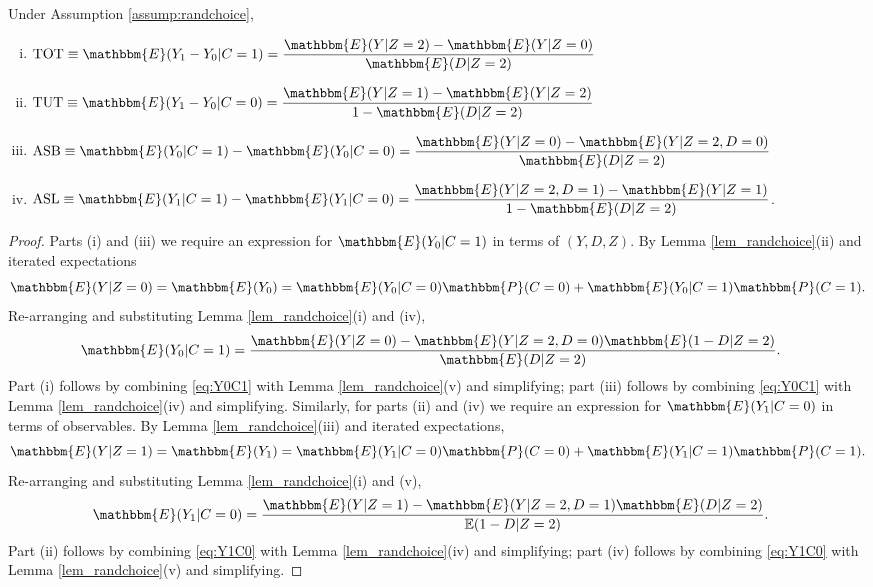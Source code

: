 \documentclass[12pt, a4paper]{article}
\begin{document}
\begin{prop} 
Under Assumption \ref{assump:randchoice},
    \begin{enumerate}[(i)]
        \item $\text{TOT} \equiv \mathbbm{E}(Y_1 - Y_0|C=1)  = \displaystyle \frac{\mathbbm{E}(Y|Z=2) - \mathbbm{E}(Y|Z=0)}{\mathbbm{E}(D|Z=2)}$
        \item $\text{TUT} \equiv \mathbbm{E}(Y_1 - Y_0|C=0) = \displaystyle \frac{\mathbbm{E}(Y|Z=1) - \mathbbm{E}(Y|Z=2)}{1 - \mathbbm{E}(D|Z=2)}$
        \item $\text{ASB} \equiv \mathbbm{E}(Y_0|C=1) - \mathbbm{E}(Y_0|C=0) = \displaystyle \frac{\mathbbm{E}(Y|Z=0) - \mathbbm{E}(Y|Z=2,D=0)}{\mathbbm{E}(D|Z=2)}$
        \item $\text{ASL} \equiv \mathbbm{E}(Y_1|C=1) - \mathbbm{E}(Y_1|C=0) = \displaystyle \frac{\mathbbm{E}(Y|Z=2,D=1) - \mathbbm{E}(Y|Z=1)}{1 - \mathbbm{E}(D|Z=2)}$.
    \end{enumerate}
\end{prop}

\begin{proof}
Parts (i) and (iii) we require an expression for $\mathbbm{E}(Y_0|C=1)$ in terms of $(Y, D, Z)$.
By Lemma \ref{lem_randchoice}(ii) and iterated expectations 
\[
\mathbbm{E}(Y|Z=0) = \mathbbm{E}(Y_0) = \mathbbm{E}(Y_0|C=0) \mathbbm{P}(C=0) + \mathbbm{E}(Y_0|C=1) \mathbbm{P}(C=1).
\]
Re-arranging and substituting Lemma \ref{lem_randchoice}(i) and (iv),
\begin{align}
\mathbbm{E}(Y_0|C=1)  
&=  \frac{\mathbbm{E}(Y|Z=0) - \mathbbm{E}(Y|Z=2,D=0) \mathbbm{E}(1 - D|Z=2)}{\mathbbm{E}(D|Z=2)}.
\label{eq:Y0C1}
\end{align}
Part (i) follows by combining \eqref{eq:Y0C1} with Lemma \ref{lem_randchoice}(v) and simplifying; part (iii) follows by combining \eqref{eq:Y0C1} with Lemma \ref{lem_randchoice}(iv) and simplifying.
Similarly, for parts (ii) and (iv) we require an expression for $\mathbbm{E}(Y_1|C=0)$ in terms of observables.
By Lemma \ref{lem_randchoice}(iii) and iterated expectations,
\[
\mathbbm{E}(Y|Z=1) = \mathbbm{E}(Y_1) = \mathbbm{E}(Y_1|C=0)\mathbbm{P}(C=0) + \mathbbm{E}(Y_1|C=1) \mathbbm{P}(C=1).
\]
Re-arranging and substituting Lemma \ref{lem_randchoice}(i) and (v),
\begin{align}
\mathbbm{E}(Y_1|C=0) 
&=\frac{\mathbbm{E}(Y|Z=1) - \mathbbm{E}(Y|Z=2,D=1)\mathbbm{E}(D|Z=2)}{\mathbb{E}(1-D|Z=2)}.
\label{eq:Y1C0}
\end{align}
Part (ii) follows by combining \eqref{eq:Y1C0} with Lemma \ref{lem_randchoice}(iv) and simplifying; part (iv) follows by combining \eqref{eq:Y1C0} with Lemma \ref{lem_randchoice}(v) and simplifying.
\end{proof}

\newpage


\end{document}

